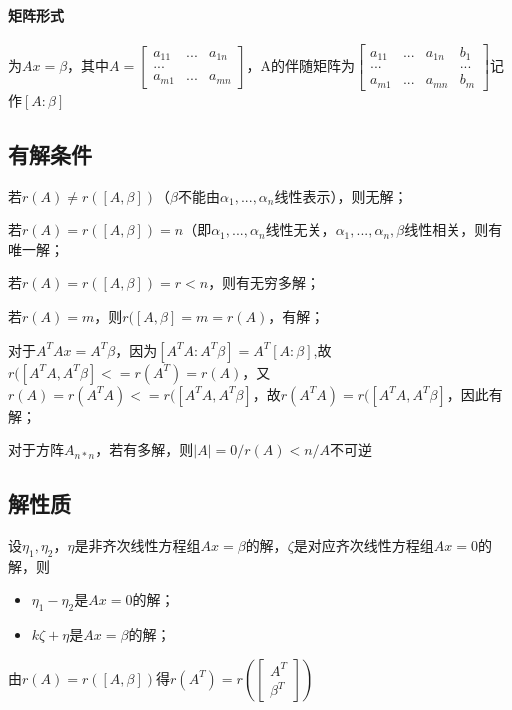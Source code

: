 \paragraph{矩阵形式}为\(Ax = \beta\)，其中\(A = \begin{bmatrix}
a_{11} & ... & a_{1n} \\ 
... \\ 
a_{m1} & ... & a_{mn}
\end{bmatrix}\)，A的伴随矩阵为\(\begin{bmatrix}
a_{11} & ... & a_{1n} & b_1 \\ 
... & & & ... \\ 
a_{m1} & ... & a_{mn} & b_m
\end{bmatrix}\)记作\([A : \beta]\)

\subsection{有解条件}
若\(r(A) \neq r([A, \beta])\)（\(\beta\)不能由\(\alpha_1, ..., \alpha_n\)线性表示），则无解；

若\(r(A) = r([A, \beta]) = n\)（即\(\alpha_1, ..., \alpha_n\)线性无关，\(\alpha_1, ..., \alpha_n, \beta\)线性相关，则有唯一解；

若\(r(A) = r([A, \beta]) = r < n\)，则有无穷多解；

若\(r(A) = m\)，则\(r([A, \beta] = m = r(A)\)，有解；

对于\(A^TAx = A^T\beta\)，因为\([A^TA : A^T\beta] = A^T[A : \beta]\),故\(r([A^TA, A^T\beta] <= r(A^T) = r(A)\)，又\(r(A) = r(A^TA) <= r([A^TA, A^T\beta]\)，故\(r(A^TA) = r([A^TA, A^T\beta]\)，因此有解；

对于方阵\(A_{n * n}\)，若有多解，则\(|A| = 0/r(A) < n/A\text{不可逆}\)

\subsection{解性质}
设\(\eta_1, \eta_2\)，\(\eta\)是非齐次线性方程组\(Ax = \beta\)的解，\(\zeta\)是对应齐次线性方程组\(Ax = 0\)的解，则\begin{itemize}
    \item \(\eta_1 - \eta_2\)是\(Ax = 0\)的解；
    \item \(k\zeta + \eta\)是\(Ax = \beta\)的解；
\end{itemize}

由\(r(A) = r([A, \beta])\)得\(r(A^T) = r(\begin{bmatrix}
A^T \\ 
\beta^T
\end{bmatrix})\)


